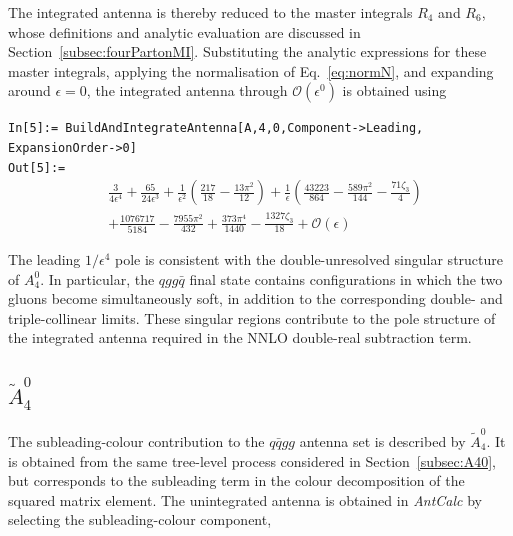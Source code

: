The integrated antenna is thereby reduced to the master integrals $R_4$ and $R_6$, whose
definitions and analytic evaluation are discussed in Section~\ref{subsec:fourPartonMI}.
Substituting the analytic expressions for these master integrals, applying the normalisation of
Eq.~\eqref{eq:normN}, and expanding around $\epsilon=0$, the integrated antenna through
$\mathcal O(\epsilon^0)$ is obtained using

\begin{mdframed}[backgroundcolor=gray!10, linewidth=0pt]
\texttt{In[5]:= BuildAndIntegrateAntenna[A,4,0,Component->Leading,\\ExpansionOrder->0]}\\
\hfill
\texttt{Out[5]:=}
    \begin{equation*}
        \begin{split}
            &\frac3{4\epsilon^4}+\frac{65}{24\epsilon^3}+\frac{1}{\epsilon^2}\!\left(\frac{217}{18}-\frac{13\pi^2}{12}\right)+\frac1\epsilon\!\left(\frac{43223}{864}-\frac{589\pi^2}{144}-\frac{71\zeta_3}{4}\right)\\
            &+\frac{1076717}{5184}-\frac{7955\pi^2}{432}+\frac{373\pi^4}{1440}-\frac{1327\zeta_3}{18}+\mathcal O(\epsilon)
        \end{split}
    \end{equation*}
\end{mdframed}

The leading $1/\epsilon^4$ pole is consistent with the double-unresolved singular structure of
$A_4^0$. In particular, the $qgg\bar q$ final state contains configurations in which the two
gluons become simultaneously soft, in addition to the corresponding double- and triple-collinear
limits. These singular regions contribute to the pole structure of the integrated antenna
required in the NNLO double-real subtraction term.

\subsection{$\tilde A_4^0$}\label{subsec:A40t}


The subleading-colour contribution to the $q\bar qgg$ antenna set is described by
$\widetilde A_4^0$. It is obtained from the same tree-level process considered in
Section~\ref{subsec:A40}, but corresponds to the subleading term in the colour decomposition of
the squared matrix element. The unintegrated antenna is obtained in \textit{AntCalc} by
selecting the subleading-colour component,

